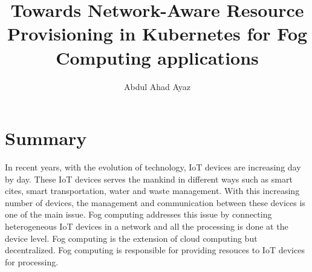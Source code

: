 \documentclass[12pt,twoside,doublepage]{article}
\newcommand{\teilnehmer}{Abdul Ahad Ayaz}
\newcommand{\ausarbeitung}{Towards Network-Aware Resource Provisioning in Kubernetes
for Fog Computing applications}
\begin{document}
\title{\ausarbeitung}
\author{\teilnehmer}
\date{}
\maketitle
\thispagestyle{empty}





\section{Summary}
\label{sec:summary}

In recent years, with the evolution of technology, IoT devices are increasing day
by day. These IoT devices serves the mankind in different ways such as smart cites,
smart transportation, water and waste management. With this increasing number of devices,
the management and communication between these devices is one of the main issue. Fog computing
addresses this issue by connecting heterogeneous IoT devices in a network and all the processing is done at the device level. Fog computing is the extension of cloud computing but decentralized. Fog computing is responsible for providing resouces to IoT devices for processing. 



\end{document}

